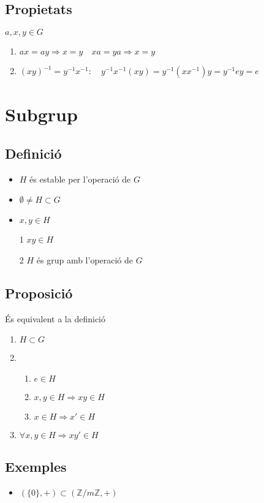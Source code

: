 \documentclass[a4paper,10pt]{article}
\newcommand{\Z}{\mathbb{Z}}
\begin{document}
\subsection*{Propietats}
$a, x, y \in G$
\begin{enumerate}
\item $ax = ay \Rightarrow x = y\quad xa = ya \Rightarrow x = y$
\item $(xy)^{-1} = y^{-1}x^{-1}:\quad y^{-1}x^{-1} (xy) = y^{-1} (xx^{-1}) y = y^{-1} e y = e$
\end{enumerate}

\section{Subgrup}
\subsection*{Definició}
\begin{itemize}
\item $H$ és estable per l'operació de $G$
\item $\emptyset \neq H \subset G$
\item $x, y \in H$
\item[1] $xy \in H$
\item[2] $H$ és grup amb l'operació de $G$
\end{itemize}
\subsection*{Proposició}
És equivalent a la definició
\begin{enumerate}
\item $H \subset G$
\item
	\begin{enumerate}
	\item $e \in H$
	\item $x, y \in H \Rightarrow xy \in H$
	\item $x \in H \Rightarrow x' \in H$
	\end{enumerate}
\item $\forall x, y \in H \Rightarrow xy' \in H$
\end{enumerate}
\subsection*{Exemples}
\begin{itemize}
\item $(\{0\}, +) \subset (\Z/m\Z, +)$
\end{itemize}
\end{document}
